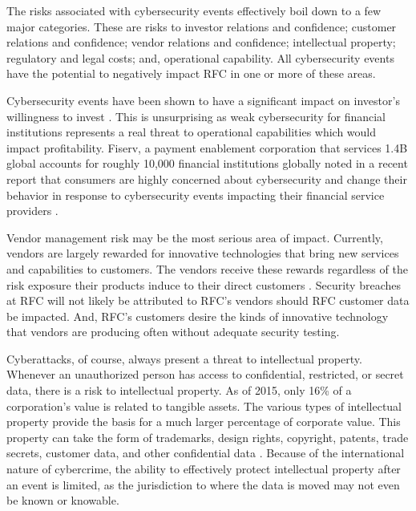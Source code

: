 The risks associated with cybersecurity events effectively boil down to a few major categories. These are risks to investor relations and confidence; customer relations and confidence; vendor relations and confidence; intellectual property; regulatory and legal costs; and, operational capability. All cybersecurity events have the potential to negatively impact RFC in one or more of these areas.

Cybersecurity events have been shown to have a significant impact on investor's willingness to invest \parencite{perolsImpactCybersecurityRisk2021}. This is unsurprising as weak cybersecurity for financial institutions represents a real threat to operational capabilities which would impact profitability. Fiserv, a payment enablement corporation that services 1.4B global accounts for roughly 10,000 financial institutions globally noted in a recent report that consumers are highly concerned about cybersecurity and change their behavior in response to cybersecurity events impacting their financial service providers \parencite{davies2020TrendsFraud2020}.

Vendor management risk may be the most serious area of impact. Currently, vendors are largely rewarded for innovative technologies that bring new services and capabilities to customers. The vendors receive these rewards regardless of the risk exposure their products induce to their direct customers \parencite{vagleCybersecurityMoralHazard2020}. Security breaches at RFC will not likely be attributed to RFC's vendors should RFC customer data be impacted. And, RFC's customers desire the kinds of innovative technology that vendors are producing often without adequate security testing.

Cyberattacks, of course, always present a threat to intellectual property. Whenever an unauthorized person has access to confidential, restricted, or secret data, there is a risk to intellectual property. As of 2015, only 16\% of a corporation's value is related to tangible assets. The various types of intellectual property provide the basis for a much larger percentage of corporate value. This property can take the form of trademarks, design rights, copyright, patents, trade secrets, customer data, and other confidential data \parencite{wymerCybersecurityShareholdersBoardroom2018}. Because of the international nature of cybercrime, the ability to effectively protect intellectual property after an event is limited, as the jurisdiction to where the data is moved may not even be known or knowable.

